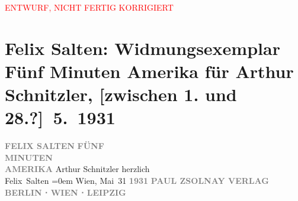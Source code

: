 
\begin{center}
            \textcolor{red}{ENTWURF, NICHT FERTIG KORRIGIERT}
                      \end{center}
            
         
         \renewcommand{\erwaehntePersonen}{Personen: Felix Salten}
         \renewcommand{\erwaehnteInstitutionen}{Institutionen: Paul Zsolnay Verlag}
         \renewcommand{\erwaehnteOrte}{Orte: Berlin, Leipzig, Wien}
         \renewcommand{\erwaehnteWerke}{Werke: Fünf Minuten Amerika}
               \section[Felix Salten: Widmungsexemplar Fünf Minuten Amerika für Arthur Schnitzler, {[}zwischen 1. und 28.?{]} 5. 1931]{ Felix Salten: Widmungsexemplar Fünf Minuten Amerika für Arthur
               Schnitzler, {[}zwischen 1. und 28.?{]} 5. 1931}\nopagebreak{}\rehead{ }\begin{ledgroupsized}[t]{13cm}\normalsize\beginnumbering \toendnotes[C]{\smallbreak\pagebreak[2]} 
\pstart
           \noindent{}\centering{}{\pb}\textcolor{gray}{\textbf{FELIX SALTEN}}\pend
           \pstart
           \noindent{}\centering{}\textcolor{gray}{\textbf{FÜNF{\\}MINUTEN{\\}AMERIKA}}\pend
           {\bigskip}\pstart
           \noindent{}Arthur Schnitzler\pend
           \pstart
           herzlich{\\[\baselineskip]}\spacefill\mbox{Felix Salten}\pend
           \leftskip=0em{}\pstart
           Wien, Mai 31\pend
           {\bigskip}\pstart
           \noindent{}\centering{}\textcolor{gray}{\textbf{1931}}\pend
           \pstart
           \noindent{}\centering{}\textcolor{gray}{\textbf{PAUL ZSOLNAY VERLAG}}\pend
           \pstart
           \noindent{}\centering{}\textcolor{gray}{\textbf{BERLIN ⋅ WIEN ⋅ LEIPZIG}}\pend
           
         
         \endnumbering{}\end{ledgroupsized}\begin{anhang}\end{anhang}\newcommand{\dateiname}{L03049}\newcommand{\titel}{Felix Salten: Widmungsexemplar Fünf Minuten Amerika für Arthur Schnitzler, [zwischen 1. und 28.?] 5. 1931}\newcommand{\editorInnen}{Martin Anton Müller und Laura Untner}
      
